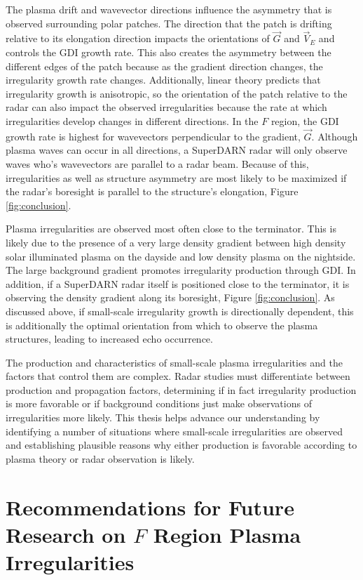 The plasma drift and wavevector directions influence the asymmetry that is observed surrounding polar patches.  The direction that the patch is drifting relative to its elongation direction impacts the orientations of \(\vec{G}\) and \(\vec{V}_E\) and controls the GDI growth rate.  This also creates the asymmetry between the different edges of the patch because as the gradient direction changes, the irregularity growth rate changes.  Additionally, linear theory predicts that irregularity growth is anisotropic, so the orientation of the patch relative to the radar can also impact the observed irregularities because the rate at which irregularities develop changes in different directions.  In the \(F\) region, the GDI growth rate is highest for wavevectors perpendicular to the gradient, \(\vec{G}\).  Although plasma waves can occur in all directions, a SuperDARN radar will only observe waves who's wavevectors are parallel to a radar beam.  Because of this, irregularities as well as structure asymmetry are most likely to be maximized if the radar's boresight is parallel to the structure's elongation, Figure \ref{fig:conclusion}.

Plasma irregularities are observed most often close to the terminator.  This is likely due to the presence of a very large density gradient between high density solar illuminated plasma on the dayside and low density plasma on the nightside.  The large background gradient promotes irregularity production through GDI.  In addition, if a SuperDARN radar itself is positioned close to the terminator, it is observing the density gradient along its boresight, Figure \ref{fig:conclusion}.  As discussed above, if small-scale irregularity growth is directionally dependent, this is additionally the optimal orientation from which to observe the plasma structures, leading to increased echo occurrence.

The production and characteristics of small-scale plasma irregularities and the factors that control them are complex.  Radar studies must differentiate between production and propagation factors, determining if in fact irregularity production is more favorable or if background conditions just make observations of irregularities more likely.  This thesis helps advance our understanding by identifying a number of situations where small-scale irregularities are observed and establishing plausible reasons why either production is favorable according to plasma theory or radar observation is likely.

\section{Recommendations for Future Research on \(F\) Region Plasma Irregularities}
\label{sec:futurework}


